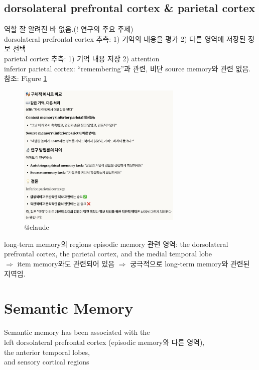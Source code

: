 \documentclass[../note.tex]{subfiles}
\begin{document}
\subsection{dorsolateral prefrontal cortex \& parietal cortex}
역할 잘 알려진 바 없음.(! 연구의 주요 주제)\\
dorsolateral prefrontal cortex 추측: 1) 기억의 내용을 평가 2) 다른 영역에 저장된 정보 선택\\
parietal cortex 추측: 1) 기억 내용 저장 2) attention\\
inferior parietal cortex: ``remembering''과 관련, 비단 source memory와 관련 없음.참조: Figure \ref{fig:claude_inferior}\\
\begin{figure}[htbp]
  \centering
  \includegraphics[width=0.7\textwidth]{image/claude_inferior}
  \caption{@claude}
  \label{fig:claude_inferior}
\end{figure}

\begin{note}{long-term memory의 regions}
  episodic memory 관련 영역: the dorsolateral prefrontal cortex, the parietal cortex, and the medial temporal lobe\\
  $\Longrightarrow$ item memory와도 관련되어 있음 $\Longrightarrow$ 궁극적으로 long-term memory와 관련된 지역임.
\end{note}

\section{Semantic Memory}
Semantic memory has been associated with the\\
left dorsolateral prefrontal cortex (episodic memory와 다른 영역),\\
the anterior temporal lobes,\\
and sensory cortical regions\\
\end{document}
